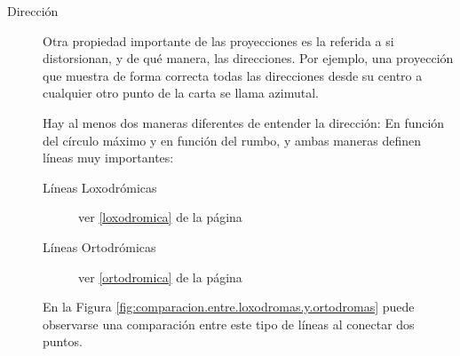 \documentclass[a4paper,12pt,twoside]{article}
\newcommand{\fullref}[1]{\ref{#1} de la p\'agina \pageref{#1}}
\begin{document}
\begin{description}
\item[Dirección]  Otra propiedad importante de las proyecciones es la referida a si distorsionan, y de qué manera, las direcciones. Por ejemplo, una proyección que muestra de forma correcta todas las direcciones desde su centro a cualquier otro punto de la carta se llama azimutal.

Hay al menos dos maneras diferentes de entender la dirección: En función del círculo máximo y en función del rumbo, y ambas maneras definen líneas muy importantes: 

\begin{description}
	\item[Líneas Loxodrómicas] ver  \fullref{loxodromica}
	\item[Líneas Ortodrómicas] ver \fullref{ortodromica}
\end{description}

En la Figura \ref{fig:comparacion.entre.loxodromas.y.ortodromas} puede observarse una comparaci\'on entre este tipo de l\'ineas al conectar dos puntos.


\end{description}
\end{document}

